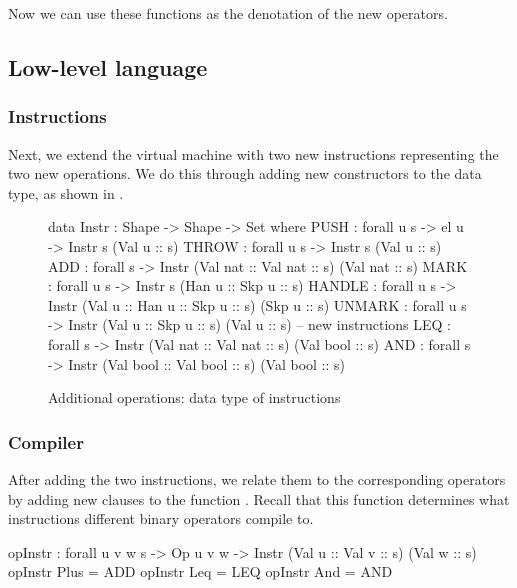 \noindent Now we can use these functions as the denotation of the new operators.


\subsection{Low-level language}

\subsubsection{Instructions}

Next, we extend the virtual machine with two new instructions representing
the two new operations. We do this through adding new constructors to the
 data type, as shown in .

\begin{figure}
\begin{code}
  data Instr : Shape -> Shape -> Set where
    PUSH : forall {u s} -> el u -> Instr s (Val u :: s)
    THROW : forall {u s} -> Instr s (Val u :: s)
    ADD : forall {s} -> Instr (Val nat :: Val nat :: s) (Val nat :: s)
    MARK : forall {u s} -> Instr s (Han u :: Skp u :: s)
    HANDLE : forall {u s} -> Instr (Val u :: Han u :: Skp u :: s) (Skp u :: s)
    UNMARK : forall {u s} -> Instr (Val u :: Skp u :: s) (Val u :: s)
    --  new instructions
    LEQ : forall {s} -> Instr (Val nat :: Val nat :: s) (Val bool :: s)
    AND : forall {s} -> Instr (Val bool :: Val bool :: s) (Val bool :: s)
\end{code}
\caption{Additional operations: data type of instructions}
\label{fig:more-ops-instr}
\end{figure}

\subsubsection{Compiler}

After adding the two instructions, we relate them to the corresponding operators
by adding new clauses to the function . Recall that this
function determines what instructions different binary operators compile to.

\begin{code}
  opInstr : forall {u v w s} -> Op u v w -> Instr (Val u :: Val v :: s) (Val w :: s)
  opInstr Plus = ADD
  opInstr Leq = LEQ
  opInstr And = AND
\end{code}

